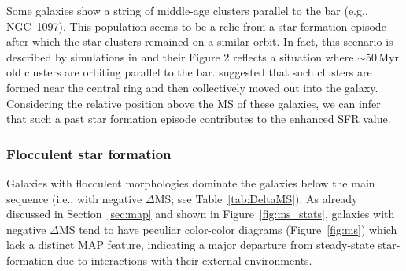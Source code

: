 \documentclass[linenumbers]{aastex63}
\begin{document}
{Some galaxies show a string of middle-age clusters parallel to the bar (e.g., NGC~1097). This population seems to be a relic from a star-formation episode after which the star clusters remained on a similar orbit. In fact, this scenario is described by simulations in \citet{dobbs_age_2010} and their Figure 2 reflects a situation where $\sim50$\,Myr old clusters are orbiting parallel to the bar. \citet{sormani_simulations_2020} suggested that such clusters are formed near the central ring and then collectively moved out into the galaxy. %
Considering the relative position above the MS of these galaxies, we can infer that such a past star formation episode contributes to the enhanced SFR value.


\subsubsection{Flocculent star formation}


Galaxies with flocculent morphologies dominate the galaxies below the main sequence (i.e., with negative $\Delta$MS; see Table~\ref{tab:DeltaMS}). As already discussed in Section~\ref{sec:map} and shown in Figure~\ref{fig:ms_stats}, galaxies with negative $\Delta$MS tend to have peculiar color-color diagrams (Figure~\ref{fig:ms}) which lack a distinct MAP feature, indicating a major departure from steady-state star-formation due to interactions with their external environments. 

}
\end{document}
